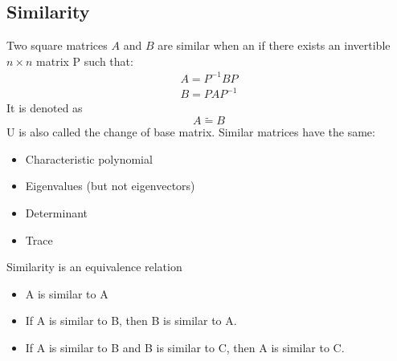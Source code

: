 \subsection{Similarity}\label{similiarity}
Two square matrices $A$ and $B$ are similar when an if there exists an invertible $n \times n$ matrix P such that:
\begin{gather}
    A = P^{-1}BP \\
    B = PAP^{-1}
\end{gather}
It is denoted as
\begin{equation*}
    A \tilde{=} B
\end{equation*}
U is also called the change of base matrix.
Similar matrices have the same:
\begin{itemize}
    \item Characteristic polynomial
    \item Eigenvalues (but not eigenvectors)
    \item Determinant
    \item Trace
\end{itemize}
Similarity is an equivalence relation
\begin{itemize}
    \item A is similar to A
    \item If A is similar to B, then B is similar to A.
    \item If A is similar to B and B is similar to C, then A is similar to C.
\end{itemize}
